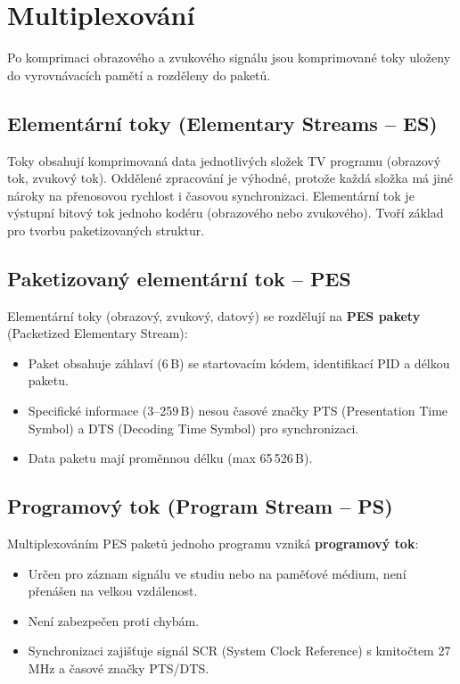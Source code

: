 \section{Multiplexování}
Po komprimaci obrazového a zvukového signálu jsou komprimované toky uloženy do vyrovnávacích pamětí a rozděleny do paketů.

\subsection{Elementární toky (Elementary Streams -- ES)}
Toky obsahují komprimovaná data jednotlivých složek TV programu (obrazový tok, zvukový tok). Oddělené zpracování je výhodné, protože každá složka má jiné nároky na přenosovou rychlost i časovou synchronizaci. Elementární tok je výstupní bitový tok jednoho kodéru (obrazového nebo zvukového). Tvoří základ pro tvorbu paketizovaných struktur.

\subsection{Paketizovaný elementární tok -- PES}
Elementární toky (obrazový, zvukový, datový) se rozdělují na \textbf{PES pakety} (Packetized Elementary Stream):
\begin{itemize}
    \item Paket obsahuje záhlaví (6\,B) se startovacím kódem, identifikací PID a délkou paketu.
    \item Specifické informace (3--259\,B) nesou časové značky PTS (Presentation Time Symbol) a DTS (Decoding Time Symbol) pro synchronizaci.
    \item Data paketu mají proměnnou délku (max 65\,526\,B).
\end{itemize}

\subsection{Programový tok (Program Stream -- PS)}
Multiplexováním PES paketů jednoho programu vzniká \textbf{programový tok}:
\begin{itemize}
    \item Určen pro záznam signálu ve studiu nebo na paměťové médium, není přenášen na velkou vzdálenost.
    \item Není zabezpečen proti chybám.
    \item Synchronizaci zajišťuje signál SCR (System Clock Reference) s kmitočtem 27\,MHz a časové značky PTS/DTS.
\end{itemize}

